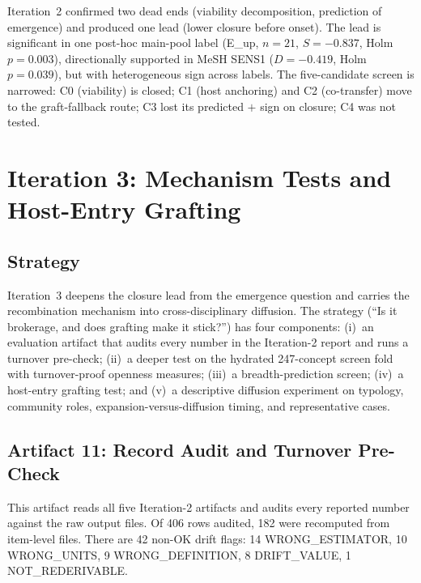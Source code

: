 \documentclass[11pt,letterpaper]{article}
\begin{document}
Iteration~2 confirmed two dead ends (viability decomposition, prediction of emergence) and produced one lead (lower closure before onset). The lead is significant in one post-hoc main-pool label (E\_up, $n = 21$, $S = -0.837$, Holm $p = 0.003$), directionally supported in MeSH SENS1 ($D = -0.419$, Holm $p = 0.039$), but with heterogeneous sign across labels. The five-candidate screen is narrowed: C0 (viability) is closed; C1 (host anchoring) and C2 (co-transfer) move to the graft-fallback route; C3 lost its predicted $+$ sign on closure; C4 was not tested.


\section{Iteration 3: Mechanism Tests and Host-Entry Grafting}
\label{sec:iter3}

\subsection{Strategy}

Iteration~3 deepens the closure lead from the emergence question and carries the recombination mechanism into cross-disciplinary diffusion.
The strategy (``Is it brokerage, and does grafting make it stick?'') has four components:
(i)~an evaluation artifact that audits every number in the Iteration-2 report and runs a turnover pre-check;
(ii)~a deeper test on the hydrated 247-concept screen fold with turnover-proof openness measures;
(iii)~a breadth-prediction screen;
(iv)~a host-entry grafting test;
and (v)~a descriptive diffusion experiment on typology, community roles, expansion-versus-diffusion timing, and representative cases.

\subsection{Artifact 11: Record Audit and Turnover Pre-Check}

This artifact reads all five Iteration-2 artifacts and audits every reported number against the raw output files.
Of 406 rows audited, 182 were recomputed from item-level files. There are 42 non-OK drift flags: 14 WRONG\_ESTIMATOR, 10 WRONG\_UNITS, 9 WRONG\_DEFINITION, 8 DRIFT\_VALUE, 1 NOT\_REDERIVABLE.
\end{document}
